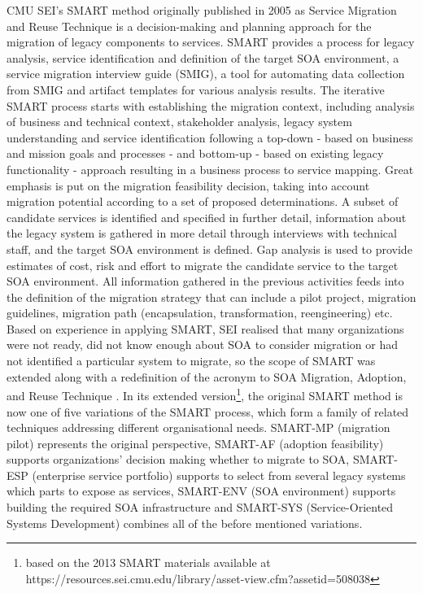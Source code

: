 CMU SEI's SMART method \autocite{Lewis2008SMART,Lewis2005SMART} originally published in 2005 as Service Migration and Reuse Technique is a decision-making and planning approach for the migration of legacy components to services.
SMART provides a process for legacy analysis, service identification and definition of the target SOA environment, a service migration interview guide (SMIG), a tool for automating data collection from SMIG and artifact templates for various analysis results.
The iterative SMART process starts with establishing the migration context, including analysis of business and technical context, stakeholder analysis, legacy system understanding and service identification following a top-down - based on business and mission goals and processes - and bottom-up - based on existing legacy functionality - approach resulting in a business process to service mapping.
Great emphasis is put on the migration feasibility decision, taking into account migration potential according to a set of proposed determinations.
A subset of candidate services is identified and specified in further detail, information about the legacy system is gathered in more detail through interviews with technical staff, and the target SOA environment is defined.
Gap analysis is used to provide estimates of cost, risk and effort to migrate the candidate service to the target SOA environment.
All information gathered in the previous activities feeds into the definition of the migration strategy that can include a pilot project, migration guidelines, migration path (encapsulation, transformation, reengineering) etc.
Based on experience in applying SMART, SEI realised that many organizations were not ready, did not know enough about SOA to consider migration or had not identified a particular system to migrate, so the scope of SMART was extended along with a redefinition of the acronym to SOA Migration, Adoption, and Reuse Technique \autocite{Lewis2010SMART}.
In its extended version\footnote{based on the 2013 SMART materials available at https://resources.sei.cmu.edu/library/asset-view.cfm?assetid=508038}, the original SMART method is now one of five variations of the SMART process, which form a family of related techniques addressing different organisational needs.
SMART-MP (migration pilot) represents the original perspective, SMART-AF (adoption feasibility) supports organizations' decision making whether to migrate to SOA, SMART-ESP (enterprise service portfolio) supports to select from several legacy systems which parts to expose as services, SMART-ENV (SOA environment) supports building the required SOA infrastructure and SMART-SYS (Service-Oriented Systems Development) combines all of the before mentioned variations.
